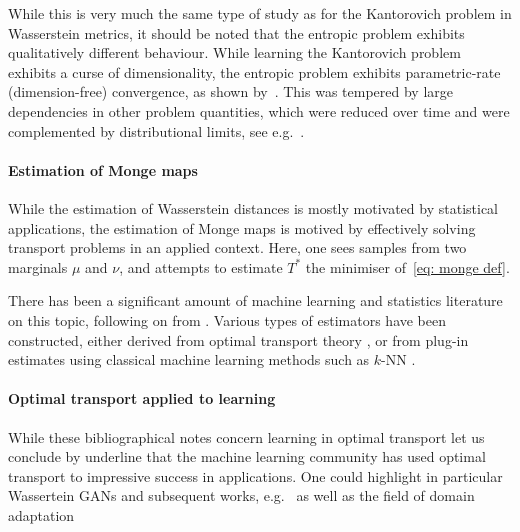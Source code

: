             While this is very much the same type of study as for the Kantorovich problem in Wasserstein metrics, it should be noted that the entropic problem exhibits qualitatively different behaviour. While learning the Kantorovich problem exhibits a curse of dimensionality, the entropic problem exhibits parametric-rate (dimension-free) convergence, as shown by~\cite{genevay_sample_2019,rigollet_sample_2022}. This was tempered by large dependencies in other problem quantities, which were reduced over time \citep{stromme_minimum_2024} and were complemented by distributional limits, see e.g.\ \citep{gonzalez-sanz_weak_2024}.

        \paragraph{Estimation of Monge maps}
            While the estimation of Wasserstein distances is mostly motivated by statistical applications, the estimation of Monge maps is motived by effectively solving transport problems in an applied context. Here, one sees samples from two marginals $\mu$ and $\nu$, and attempts to estimate $T^*$ the minimiser of~\eqref{eq: monge def}. 
            
            There has been a significant amount of machine learning and statistics literature on this topic, following on from \citep{hutter_minimax_2021,gunsilius_convergence_2022}. Various types of estimators have been constructed, either derived from optimal transport theory \citep{hutter_minimax_2021}, or from plug-in estimates using classical machine learning methods such as $k$-NN \citep{manole_plugin_2024,deb_rates_2021}. 

        
        \paragraph{Optimal transport applied to learning}

        While these bibliographical notes concern learning in optimal transport let us conclude by underline that the machine learning community has used optimal transport to impressive success in applications. One could highlight in particular Wassertein GANs \citep{arjovsky_wasserstein_2017} and subsequent works, e.g.\ \citep{salimans_improving_2018} as well as the field of domain adaptation \citep{courty_joint_2017,torres_survey_2021}
